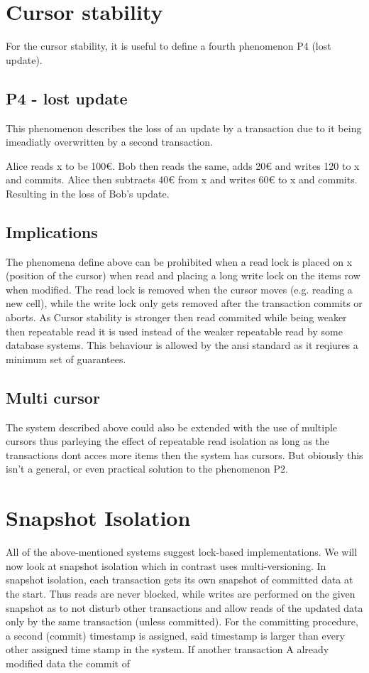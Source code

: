 \documentclass[sigconf, review=true]{acmart}
\begin{document}
\section{Cursor stability}
For the cursor stability, it is useful to define a fourth phenomenon P4 (lost update).
\subsection{ P4  - lost update}
This phenomenon describes the loss of an update by a transaction due to it being imeadiatly overwritten
by a second transaction.
\begin{example}
    Alice reads x to be 100€. Bob then reads the same, adds 20€ and writes 120 to x and commits.
    Alice then subtracts 40€ from x and writes 60€ to x and commits. Resulting in the loss of Bob's update.
\end{example}
\subsection{Implications}
The phenomena define above can be prohibited when a read lock is placed on x (position of the cursor) when
read and placing a long write lock on the items row when modified.
The read lock is removed when the cursor moves (e.g. reading a new cell),
while the write lock only gets removed after the transaction commits or aborts.
As Cursor stability is stronger then read commited while being weaker then repeatable read it
is used instead of the weaker repeatable read by some database systems. This behaviour is allowed by the ansi standard
as it reqiures a minimum set of guarantees.
\subsection{Multi cursor}
The system described above could also be extended with the use of multiple cursors thus
parleying the effect of repeatable read isolation as long as the transactions dont acces more items
then the system has cursors. But obiously this isn't a general, or even practical solution to the phenomenon P2.


\section{Snapshot Isolation}
All of the above-mentioned systems suggest lock-based implementations. We will now look at
snapshot isolation which in contrast uses multi-versioning.
In snapshot isolation, each transaction gets its own snapshot of committed data at the start.
Thus reads are never blocked, while writes are performed on the given snapshot as to not disturb
other transactions and allow reads of the updated data only by the same transaction (unless committed).
For the committing procedure, a second (commit) timestamp is assigned, said timestamp is larger than every
other assigned time stamp in the system. If another transaction A already modified data the commit of
\end{document}
